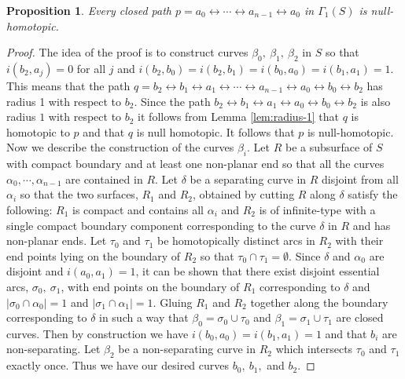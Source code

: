\documentclass[10pt,a4paper]{amsart}
\newtheorem{proposition}{Proposition}
\def\a{\alpha}
\def\b{\beta}
\def\lr{\leftrightarrow}
\begin{document}
\begin{proposition}\label{prop:base-case}
  Every closed path $p=a_0\lr\cdots\lr a_{n-1}\lr a_0$ in $\Gamma_1(S)$ is null-homotopic.
\end{proposition}

\begin{proof}
  The idea of the proof is to construct curves $\b_0,\ \b_1,\ \b_2$ in $S$ so that $i(b_2,a_j) = 0$ for all $j$ and $i(b_2,b_0) = i(b_2,b_1)= i(b_0,a_0) = i(b_1,a_1) = 1$. This means that the path $q= b_2 \lr b_1 \lr a_1 \lr \cdots \lr a_{n-1}\lr a_0 \lr b_0 \lr b_2$ has radius 1 with respect to $b_2$. Since the path $b_2\lr b_1\lr a_1 \lr a_0\lr b_0\lr b_2$ is also radius $1$ with respect to $b_2$ it follows from Lemma \ref{lem:radius-1} that $q$ is homotopic to $p$ and that $q$ is null homotopic. It follows that $p$ is null-homotopic.\\


  Now we describe the construction of the curves $\b_i$. Let $R$ be a subsurface of $S$ with compact boundary and at least one non-planar end so that all the curves $\a_0,\cdots, \a_{n-1}$ are contained in $R$. Let $\delta$ be a separating curve in $R$ disjoint from all $\a_i$ so that the two surfaces, $R_1$ and $R_2$, obtained by cutting $R$ along $\delta$ satisfy the following: $R_1$ is compact and contains all $\a_i$ and $R_2$ is of infinite-type with a single compact boundary component corresponding to the curve $\delta$ in $R$ and has non-planar ends. Let $\tau_0$ and $\tau_1$ be homotopically distinct arcs in $R_2$ with their end points lying on the boundary of $R_2$ so that $\tau_0\cap \tau_1 = \emptyset$. Since $\delta$ and $\a_0$ are disjoint and $i(a_0,a_1)=1$, it can be shown that there exist disjoint essential arcs, $\sigma_0,\ \sigma_1$, with end points on the boundary of $R_1$ corresponding to $\delta$ and $|\sigma_0\cap \a_0| = 1$ and $|\sigma_1\cap \a_1|=1$. Gluing $R_1$ and $R_2$ together along the boundary corresponding to $\delta$ in such a way that $\beta_0 = \sigma_0\cup \tau_0$ and $\beta_1 = \sigma_1\cup \tau_1$ are closed curves. Then by construction we have $i(b_0,a_0) = i(b_1,a_1) = 1$ and that $b_i$ are non-separating. Let $\b_2$ be a non-separating curve in $R_2$ which intersects $\tau_0$ and $\tau_1$ exactly once. Thus we have our desired curves $b_0,\ b_1,$ and $b_2$.
\end{proof}
\end{document}
